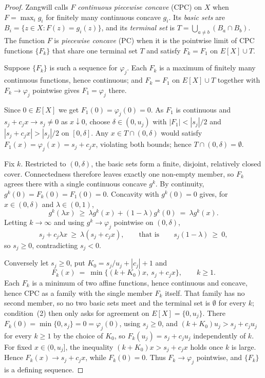 \documentclass[3p,11pt]{elsarticle}
\theoremstyle{remark}
\theoremstyle{definition}
\begin{document}
\begin{proof}
Zangwill calls $F$ \emph{continuous piecewise concave} (CPC) on $X$ when
$F=\max_i g_i$ for finitely many continuous concave $g_i$. Its \emph{basic sets} are
$B_i=\{z\in X: F(z)=g_i(z)\}$, and its \emph{terminal set} is
$T=\bigcup_{a\ne b}(B_a\cap B_b)$. The function $F$ is \emph{piecewise concave} (PC) when it is the pointwise limit of CPC functions
$\{F_k\}$ that share one terminal set $T$ and satisfy $F_k=F_1$ on $E[X]\cup T$.

Suppose $\{F_k\}$ is such a sequence for $\varphi_j$. Each $F_k$ is a maximum of finitely
many continuous functions, hence continuous; and $F_k=F_1$ on $E[X]\cup T$ together with
$F_k\to\varphi_j$ pointwise gives $F_1=\varphi_j$ there.

Since $0\in E[X]$ we get $F_1(0)=\varphi_j(0)=0$. As $F_1$ is continuous and
$s_j+c_jx\to s_j\ne0$ as $x\downarrow0$, choose $\delta\in(0,u_j)$ with $|F_1|<|s_j|/2$ and
$|s_j+c_jx|>|s_j|/2$ on $[0,\delta]$. Any $x\in T\cap(0,\delta)$ would satisfy
$F_1(x)=\varphi_j(x)=s_j+c_jx$, violating both bounds; hence $T\cap(0,\delta)=\emptyset$.

Fix $k$. Restricted to $(0,\delta)$, the basic sets form a finite, disjoint, relatively
closed cover. Connectedness therefore leaves exactly one non-empty member, so $F_k$
agrees there with a single continuous concave $g^k$. By continuity,
$g^k(0)=F_k(0)=F_1(0)=0$. Concavity with $g^k(0)=0$ gives, for $x\in(0,\delta)$ and
$\lambda\in(0,1)$,
\[
g^k(\lambda x)\ \ge\ \lambda g^k(x)+(1-\lambda)g^k(0)\ =\ \lambda g^k(x).
\]
Letting $k\to\infty$ and using $g^k\to\varphi_j$ pointwise on $(0,\delta)$,
\[
s_j+c_j\lambda x\ \ge\ \lambda(s_j+c_jx),\qquad\text{that is}\qquad s_j(1-\lambda)\ \ge\ 0 ,
\]
so $s_j\ge0$, contradicting $s_j<0$.

Conversely let $s_j\ge0$, put $K_0=s_j/u_j+|c_j|+1$ and
\[
F_k(x)\ =\ \min\bigl\{(k+K_0)x,\ s_j+c_jx\bigr\},\qquad k\ge1 .
\]
Each $F_k$ is a minimum of two affine functions, hence continuous and concave, hence CPC as
a family with the single member $F_k$ itself. That family has no second member, so no two
basic sets meet and the terminal set is $\emptyset$ for every $k$; condition~(2) then only
asks for agreement on $E[X]=\{0,u_j\}$. There $F_k(0)=\min\{0,s_j\}=0=\varphi_j(0)$, using
$s_j\ge0$, and $(k+K_0)u_j>s_j+c_ju_j$ for every $k\ge1$ by the choice of $K_0$, so
$F_k(u_j)=s_j+c_ju_j$ independently of $k$. For fixed $x\in(0,u_j]$, the inequality
$(k+K_0)x>s_j+c_jx$ holds once $k$ is large. Hence $F_k(x)\to s_j+c_jx$, while
$F_k(0)=0$. Thus $F_k\to\varphi_j$ pointwise, and $\{F_k\}$ is a defining sequence.
\end{proof}
\end{document}
